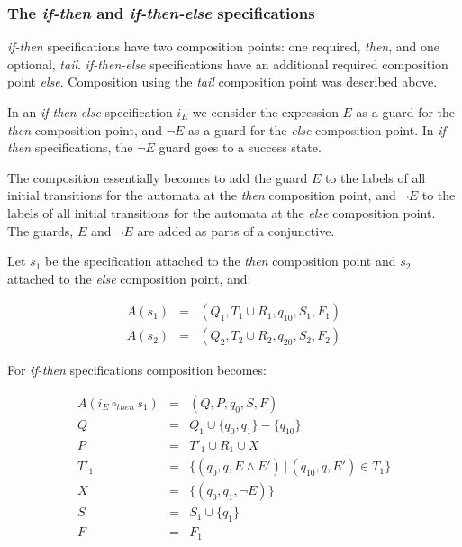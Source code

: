 \subsubsection{The \textit{if-then} and \textit{if-then-else} specifications}

\textit{if-then} specifications have two composition points: one required,
\textit{then}, and one optional, \textit{tail}. \textit{if-then-else}
specifications have an additional required composition point \textit{else}.
Composition using the \textit{tail} composition point was described above.

In an \textit{if-then-else} specification $i_E$ we consider the expression $E$
as a guard for the \textit{then} composition point, and $\neg E$ as a guard
for the \textit{else} composition point. In \textit{if-then} specifications,
the $\neg E$ guard goes to a success state.

The composition essentially becomes to add the guard $E$ to the labels of all
initial transitions for the automata at the \textit{then} composition point,
and $\neg E$ to the labels of all initial transitions for the automata at the
\textit{else} composition point. The guards, $E$ and $\neg E$ are added as
parts of a conjunctive.

Let $s_1$ be the specification attached to the \textit{then} composition point
and $s_2$ attached to the \textit{else} composition point, and:

\medskip
\[
  \begin{array}{rcl}
    A(s_1) & = & (Q_1, T_1 \cup R_1, q_{10}, S_1, F_1) \\
    A(s_2) & = & (Q_2, T_2 \cup R_2, q_{20}, S_2, F_2)
  \end{array}
\]
\medskip

For \textit{if-then} specifications composition becomes:

\medskip
\[
  \begin{array}{rcl}
  A(i_E \circ_{then} s_1) & = & (Q, P, q_0, S, F) \\
                        Q & = & Q_1 \cup \{q_0, q_1\} - \{q_{10}\} \\
                        P & = & T'_1 \cup R_1 \cup X \\
                     T'_1 & = & \{(q_0, q, E       \wedge E') \, | \, (q_{10}, q, E') \in T_1\} \\
                        X & = & \{(q_0, q_1, \neg E)\} \\
                        S & = & S_1 \cup \{q_1\} \\
                        F & = & F_1
  \end{array}
\]
\medskip

